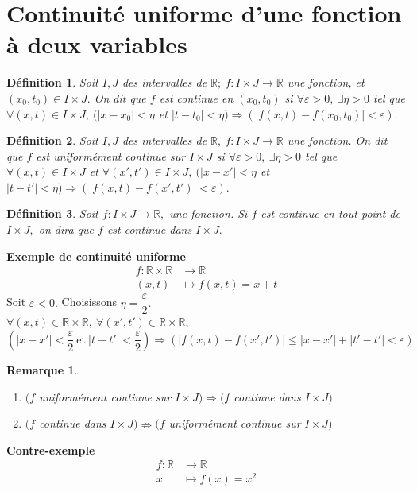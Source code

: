 \documentclass[11pt, a4paper]{book}
\newtheorem{defi}{D\'efinition}[section]
\newtheorem{rem}{Remarque}[section]
\begin{document}
\section{Continuit\'e uniforme d'une fonction \`a deux variables}
\begin{defi} Soit $I,J$ des intervalles de $\mathbb{R};~f:I\times J\rightarrow\mathbb{R}$ une fonction, et $(x_0,t_0)\in I\times J.$ On dit que $f$ est continue en $(x_0,t_0)$ si $\forall \varepsilon>0,~\exists \eta>0$ tel que $\forall (x,t)\in I\times J,~(|x-x_0|<\eta$ et $|t-t_0|<\eta)\Rightarrow(|f(x,t)-f(x_0,t_0)|<\varepsilon).$
\end{defi}
\begin{defi} Soit $I,J$ des intervalles de $\mathbb{R},~f:I\times J\rightarrow\mathbb{R}$ une fonction. On dit que $f$ est uniform\'ement continue sur $I\times J$ si $\forall \varepsilon>0,~\exists \eta>0$ tel que $\forall (x,t)\in I\times J$ et $\forall(x',t')\in I\times J,~(|x-x'|<\eta$ et $|t-t'|<\eta)\Rightarrow(|f(x,t)-f(x',t')|<\varepsilon).$
\end{defi}
\begin{defi} Soit $f:I\times J\rightarrow\mathbb{R},$ une fonction. Si $f$ est continue en tout point de $I\times J,$ on dira que $f$ est continue dans $I\times J.$
\end{defi}
\textbf{Exemple de continuit\'e uniforme}\quad
\begin{align*}
f:\mathbb{R}\times\mathbb{R}&\rightarrow\mathbb{R}\\(x,t)&\mapsto f(x,t)=x+t
\end{align*} 
Soit $\varepsilon<0.$ Choisissons $\eta=\dfrac{\varepsilon}{2}.$\\ $\forall (x,t)\in \mathbb{R}\times\mathbb{R},~\forall (x',t')\in \mathbb{R}\times\mathbb{R},$ $$(|x-x'|<\frac{\varepsilon}{2}~\text{et}~|t-t'|<\frac{\varepsilon}{2})\Rightarrow(|f(x,t)-f(x',t')|\leq|x-x'|+|t'-t'|<\varepsilon)$$
\begin{rem} \begin{enumerate}
\item[a-] $(f$ uniform\'ement continue sur $I\times J)\Rightarrow(f$ continue dans $I\times J)$
\item[b-] $(f$ continue dans $I\times J)\nRightarrow(f$ uniform\'ement continue sur $I\times J)$ 
\end{enumerate}
\end{rem}
\textbf{Contre-exemple}\quad
\begin{align*}
f:\mathbb{R}&\rightarrow\mathbb{R}\\x&\mapsto f(x)=x^2
\end{align*}
\end{document}
